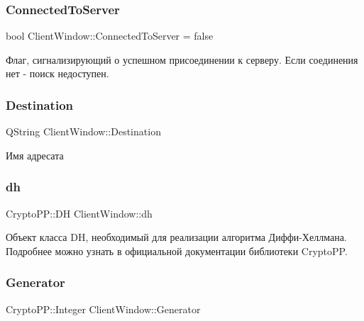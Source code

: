 \subsubsection{\texorpdfstring{Connected\+To\+Server}{ConnectedToServer}}
{\footnotesize\ttfamily bool Client\+Window\+::\+Connected\+To\+Server = false\hspace{0.3cm}{\ttfamily [private]}}



Флаг, сигнализирующий о успешном присоединении к серверу. Если соединения нет -\/ поиск недоступен. 

\mbox{\label{class_client_window_a98ff51a0d70a591431b56d5e001a51d9}} 
\subsubsection{\texorpdfstring{Destination}{Destination}}
{\footnotesize\ttfamily Q\+String Client\+Window\+::\+Destination\hspace{0.3cm}{\ttfamily [private]}}



Имя адресата 

\mbox{\label{class_client_window_a70e338edd34ee5043c35c03c6da85190}} 
\subsubsection{\texorpdfstring{dh}{dh}}
{\footnotesize\ttfamily Crypto\+P\+P\+::\+DH Client\+Window\+::dh\hspace{0.3cm}{\ttfamily [private]}}



Объект класса DH, необходимый для реализации алгоритма Диффи-\/Хеллмана. Подробнее можно узнать в официальной документации библиотеки Crypto\+PP. 

\mbox{\label{class_client_window_a72c4ff89452aba7e047970ad83c51369}} 
\subsubsection{\texorpdfstring{Generator}{Generator}}
{\footnotesize\ttfamily Crypto\+P\+P\+::\+Integer Client\+Window\+::\+Generator\hspace{0.3cm}{\ttfamily [private]}}



